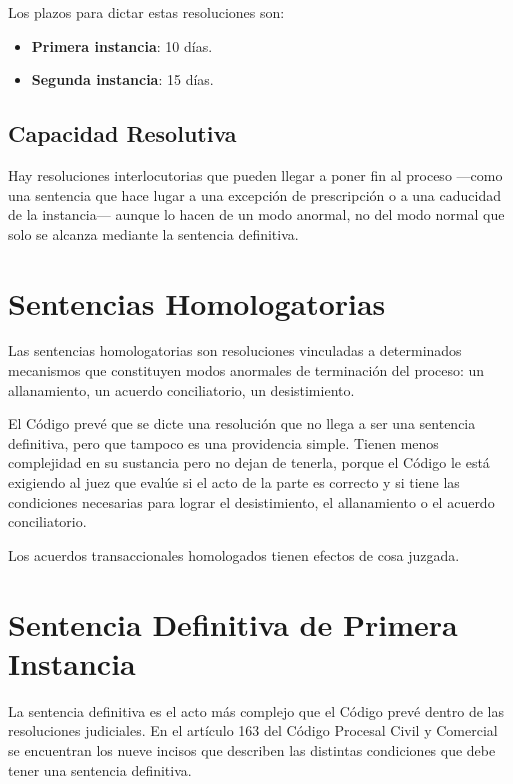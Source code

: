 \documentclass[12pt,oneside]{book}
\begin{document}
Los plazos para dictar estas resoluciones son:

\begin{itemize}
    \item \textbf{Primera instancia}: 10 días.
    \item \textbf{Segunda instancia}: 15 días.
\end{itemize}

\subsection{Capacidad Resolutiva}

Hay resoluciones interlocutorias que pueden llegar a poner fin al proceso —como una sentencia que hace lugar a una excepción de prescripción o a una caducidad de la instancia— aunque lo hacen de un modo anormal, no del modo normal que solo se alcanza mediante la sentencia definitiva.

\section{Sentencias Homologatorias}

Las sentencias homologatorias son resoluciones vinculadas a determinados mecanismos que constituyen modos anormales de terminación del proceso: un allanamiento, un acuerdo conciliatorio, un desistimiento.

El Código prevé que se dicte una resolución que no llega a ser una sentencia definitiva, pero que tampoco es una providencia simple. Tienen menos complejidad en su sustancia pero no dejan de tenerla, porque el Código le está exigiendo al juez que evalúe si el acto de la parte es correcto y si tiene las condiciones necesarias para lograr el desistimiento, el allanamiento o el acuerdo conciliatorio.

\begin{important}
Los acuerdos transaccionales homologados tienen efectos de cosa juzgada.
\end{important}

\section{Sentencia Definitiva de Primera Instancia}

La sentencia definitiva es el acto más complejo que el Código prevé dentro de las resoluciones judiciales. En el artículo 163 del Código Procesal Civil y Comercial se encuentran los nueve incisos que describen las distintas condiciones que debe tener una sentencia definitiva.
\end{document}
